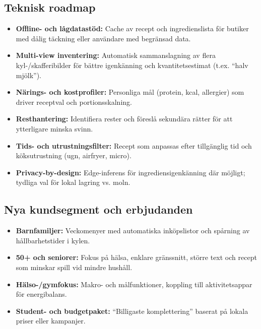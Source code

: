 \documentclass[a4paper,12pt]{article}
\begin{document}
\subsection{Teknisk roadmap}
\begin{itemize}
    \item \textbf{Offline- och lågdatastöd:} Cache av recept och ingredienslista för butiker med dålig täckning eller användare med begränsad data.
    \item \textbf{Multi-view inventering:} Automatisk sammanslagning av flera kyl-/skafferibilder för bättre igenkänning och kvantitetsestimat (t.ex. “halv mjölk”).
    \item \textbf{Närings- och kostprofiler:} Personliga mål (protein, kcal, allergier) som driver receptval och portionsskalning.
    \item \textbf{Resthantering:} Identifiera rester och föreslå sekundära rätter för att ytterligare minska svinn.
    \item \textbf{Tids- och utrustningsfilter:} Recept som anpassas efter tillgänglig tid och köksutrustning (ugn, airfryer, micro).
    \item \textbf{Privacy-by-design:} Edge-inferens för ingrediensigenkänning där möjligt; tydliga val för lokal lagring vs. moln.
\end{itemize}

\subsection{Nya kundsegment och erbjudanden}
\begin{itemize}
    \item \textbf{Barnfamiljer:} Veckomenyer med automatiska inköpslistor och spårning av hållbarhetstider i kylen.
    \item \textbf{50+ och seniorer:} Fokus på hälsa, enklare gränssnitt, större text och recept som minskar spill vid mindre hushåll.
    \item \textbf{Hälso-/gymfokus:} Makro- och målfunktioner, koppling till aktivitetsappar för energibalans.
    \item \textbf{Student- och budgetpaket:} “Billigaste komplettering” baserat på lokala priser eller kampanjer.
\end{itemize}
\end{document}
